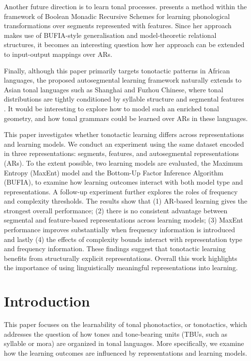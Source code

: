 Another future direction is to learn tonal
processes. \citet{Yolyan2025} presents a method within the framework
of Boolean Monadic Recursive Schemes \citep{chandleejardine21bmrs} for
learning phonological transformations over segments represented with
features. Since her approach makes use of BUFIA-style generalisation
and model-theoretic relational structures, it becomes an interesting
question how her approach can be extended to input-output mappings
over ARs.

Finally, although this paper primarily targets tonotactic patterns 
in African languages, the proposed autosegmental learning framework 
naturally extends to Asian tonal languages such as Shanghai and Fuzhou 
Chinese, where tonal distributions are tightly conditioned by syllable 
structure and segmental features \citep{yip2002tone}.
It would be interesting to explore how to model such 
an enriched tonal geometry, and how tonal grammars could be 
learned over ARs in these languages.




This paper investigates whether tonotactic learning differs
across representations and learning models. We conduct an experiment
using the same dataset encoded in three representations:
segments, features, and autosegmental representations (ARs).
To the extent possible, two learning models are evaluated, the Maximum Entropy
(MaxEnt) model and the Bottom-Up Factor Inference Algorithm
(BUFIA), to examine how learning outcomes interact with both
model type and representations. A follow-up experiment
further explores the roles of frequency and complexity
thresholds. The results show that (1) AR-based
learning gives the strongest overall performance;
(2) there is no consistent advantage between
segmental and feature-based representations
across learning models;
(3) MaxEnt performance improves substantially when
frequency information is introduced and lastly (4)
the effects of complexity bounds interact with 
representation type and frequency information.
These findings suggest that tonotactic
learning benefits from structurally explicit
representations. Overall this work highlights
the importance of using linguistically meaningful
representations into learning.



\section{Introduction}

This paper focuses on the learnability of tonal phonotactics,
or tonotactics, which addresses the question of how tones
and tone-bearing units (TBUs, such as syllable or mora) are
organized in tonal languages. More specifically, we examine
how the learning outcomes are influenced by representations
and learning models.

